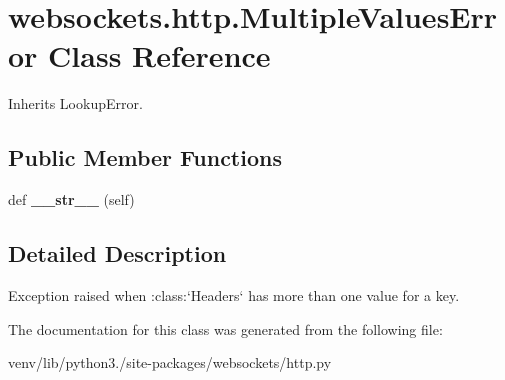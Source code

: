 \hypertarget{classwebsockets_1_1http_1_1_multiple_values_error}{}\section{websockets.\+http.\+Multiple\+Values\+Error Class Reference}
\label{classwebsockets_1_1http_1_1_multiple_values_error}


Inherits Lookup\+Error.

\subsection*{Public Member Functions}
\begin{DoxyCompactItemize}
\item 
\mbox{\label{classwebsockets_1_1http_1_1_multiple_values_error_a71c227a2acbbed0598a1537ebcfb3e5e}} 
def {\bfseries \+\_\+\+\_\+str\+\_\+\+\_\+} (self)
\end{DoxyCompactItemize}


\subsection{Detailed Description}
\begin{DoxyVerb}Exception raised when :class:`Headers` has more than one value for a key.\end{DoxyVerb}
 

The documentation for this class was generated from the following file\+:\begin{DoxyCompactItemize}
\item 
venv/lib/python3./site-\/packages/websockets/http.\+py\end{DoxyCompactItemize}
